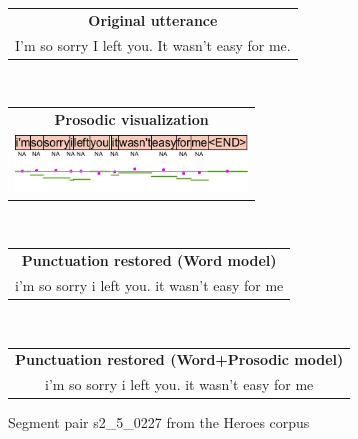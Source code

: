 \begin{figure}[h]
    \centering
    \begin{minipage}[t]{0.5\textwidth}
    \begin{tabular}{c}
    \textbf{Original utterance}\\
    I'm so sorry I left you. It wasn't easy for me. \\
    \end{tabular}
    \end{minipage}
    \\
    \begin{minipage}[t]{0.35\textwidth}
    \begin{tabular}{c}
    \textbf{Prosodic visualization}\\
    \includegraphics[height=1.5cm]{img/s2_5_0227-EN.png} \\
    \end{tabular}
    \end{minipage}
    \\
    \begin{minipage}[t]{0.5\textwidth}
    \begin{tabular}{c}
    \textbf{Punctuation restored (Word model)}\\
    i'm so sorry i left you. it wasn't easy for me \\
    \end{tabular}
    \end{minipage}
    \\
    \begin{minipage}[t]{0.5\textwidth}
    \begin{tabular}{c}
    \textbf{Punctuation restored (Word+Prosodic model)}\\
    i'm so sorry i left you. it wasn't easy for me \\
    \end{tabular}
    \end{minipage}
    \caption{Segment pair s2\_5\_0227 from the Heroes corpus}
    \label{figure:heroes_pp_1}
\end{figure}
\hfill
